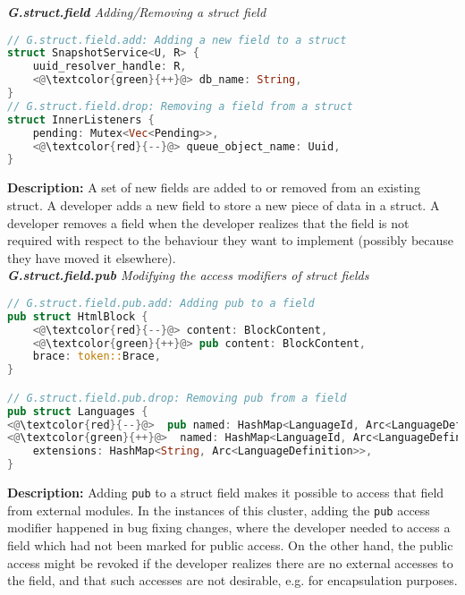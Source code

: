 \noindent\textit{\textbf{G.struct.field} Adding/Removing a struct field}

\begin{lstlisting}[language=Rust, style=colouredRust]
// G.struct.field.add: Adding a new field to a struct
struct SnapshotService<U, R> {
    uuid_resolver_handle: R,
    <@\textcolor{green}{++}@> db_name: String,
}
// G.struct.field.drop: Removing a field from a struct
struct InnerListeners {
    pending: Mutex<Vec<Pending>>,
    <@\textcolor{red}{--}@> queue_object_name: Uuid,
}

\end{lstlisting}

\noindent\textbf{Description:} A set of new fields are added to or removed from an existing struct. A developer adds a new field to store a new piece of data in a struct. A developer removes a field when the developer realizes that the field is not required with respect to the behaviour they want to implement (possibly because they have moved it elsewhere). \\

\noindent\textit{\textbf{G.struct.field.pub} Modifying the access modifiers of struct fields}

\begin{lstlisting}[language=Rust, style=colouredRust]
// G.struct.field.pub.add: Adding pub to a field
pub struct HtmlBlock {
    <@\textcolor{red}{--}@> content: BlockContent,
    <@\textcolor{green}{++}@> pub content: BlockContent,
    brace: token::Brace,
} 

// G.struct.field.pub.drop: Removing pub from a field
pub struct Languages {
<@\textcolor{red}{--}@>  pub named: HashMap<LanguageId, Arc<LanguageDefinition>>,
<@\textcolor{green}{++}@>  named: HashMap<LanguageId, Arc<LanguageDefinition>>,
    extensions: HashMap<String, Arc<LanguageDefinition>>,
}

\end{lstlisting}

\noindent\textbf{Description:} Adding \texttt{pub} to a struct field makes it possible to access that field from external modules. In the instances of this cluster, adding the \texttt{pub} access modifier happened in bug fixing changes, where the developer needed to access a field which had not been marked for public access. On the other hand, the public access might be revoked if the developer realizes there are no external accesses to the field, and that such accesses are not desirable, e.g. for encapsulation purposes.

